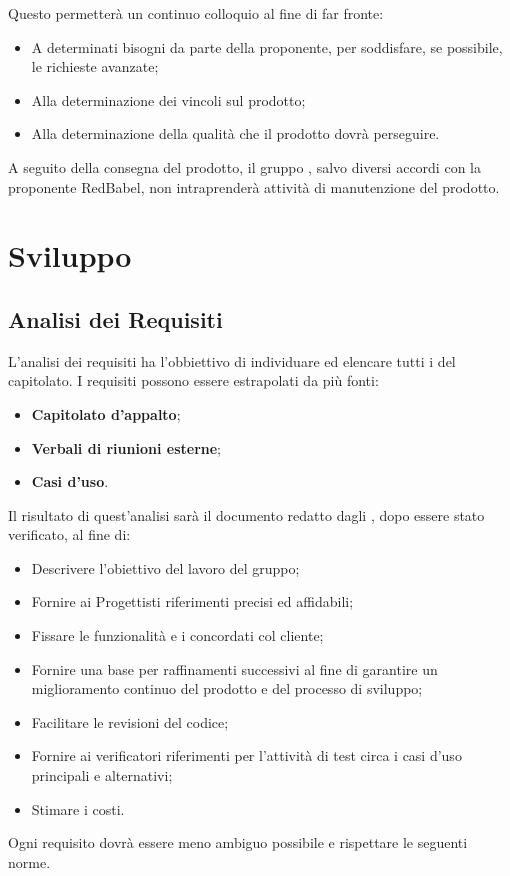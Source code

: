 \documentclass[NormeDiProgetto.tex]{subfiles}
\begin{document}
Questo permetterà un continuo colloquio al fine di far fronte:
\begin{itemize} 
	\item A determinati bisogni da parte della proponente, per soddisfare, se possibile, le richieste avanzate;
	\item Alla determinazione dei vincoli sul prodotto;
	\item Alla determinazione della qualità che il prodotto dovrà perseguire.
\end{itemize}
A seguito della consegna del prodotto, il gruppo \gruppo, salvo diversi accordi con la proponente RedBabel, non intraprenderà attività di manutenzione del prodotto. 

\section{Sviluppo}
\subsection{Analisi dei Requisiti}
L'analisi dei requisiti ha l'obbiettivo di individuare ed elencare tutti i  del capitolato. I requisiti possono essere estrapolati da più fonti:
\begin{itemize}
	\item \textbf{Capitolato d'appalto};
	\item \textbf{Verbali di riunioni esterne};
	\item \textbf{Casi d'uso}.
\end{itemize}
Il risultato di quest'analisi sarà il documento \adr \vruno redatto dagli \alisti, dopo essere stato verificato, al fine di:
\begin{itemize}
\item Descrivere l'obiettivo del lavoro del gruppo;
\item Fornire ai Progettisti riferimenti precisi ed affidabili;
\item Fissare le funzionalità e i  concordati col cliente;
\item Fornire una base per raffinamenti successivi al fine di garantire un
miglioramento continuo del prodotto e del processo di sviluppo;
\item Facilitare le revisioni del codice;
\item Fornire ai verificatori riferimenti per l'attività di test circa i casi d'uso principali e alternativi;
\item Stimare i costi.
\end{itemize}
Ogni requisito dovrà essere meno ambiguo possibile e rispettare le seguenti norme.
\end{document}
